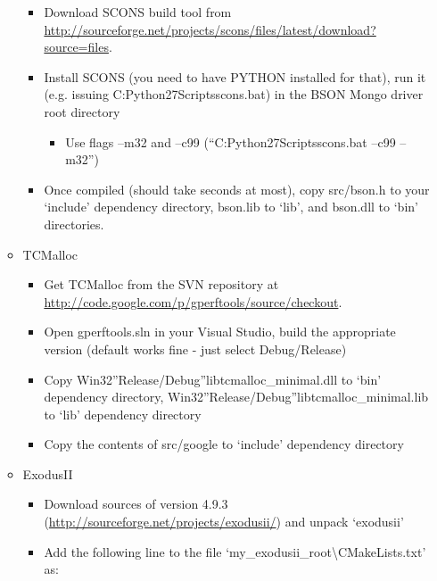 \documentclass[a4paper,0pt,english]{sphinxmanual}
\begin{document}
\begin{itemize}
\begin{itemize}
\begin{itemize}
\item {} 
Download SCONS build tool from \href{http://sourceforge.net/projects/scons/files/latest/download?source=files}{http://sourceforge.net/projects/scons/files/latest/download?source=files}.

\item {} 
Install SCONS (you need to have PYTHON installed for that), run it (e.g. issuing C:Python27Scriptsscons.bat) in the BSON Mongo driver root directory
\begin{itemize}
\item {} 
Use flags --m32 and --c99 (``C:Python27Scriptsscons.bat --c99 --m32'')

\end{itemize}

\item {} 
Once compiled (should take seconds at most), copy src/bson.h to your `include' dependency directory, bson.lib to `lib', and bson.dll to `bin' directories.

\end{itemize}

\item {} 
TCMalloc
\begin{itemize}
\item {} 
Get TCMalloc from the SVN repository at \href{http://code.google.com/p/gperftools/source/checkout}{http://code.google.com/p/gperftools/source/checkout}.

\item {} 
Open gperftools.sln in your Visual Studio, build the appropriate version (default works fine - just select Debug/Release)

\item {} 
Copy Win32''Release/Debug''libtcmalloc\_minimal.dll to `bin' dependency directory, Win32''Release/Debug''libtcmalloc\_minimal.lib to `lib' dependency directory

\item {} 
Copy the contents of src/google to `include' dependency directory

\end{itemize}

\item {} 
ExodusII
\begin{itemize}
\item {} 
Download sources of version 4.9.3 (\href{http://sourceforge.net/projects/exodusii/}{http://sourceforge.net/projects/exodusii/}) and unpack `exodusii'

\item {} 
Add the following line to the file `my\_exodusii\_root\textbackslash{}CMakeLists.txt' as:


\end{itemize}
\end{itemize}
\end{itemize}
\end{document}
